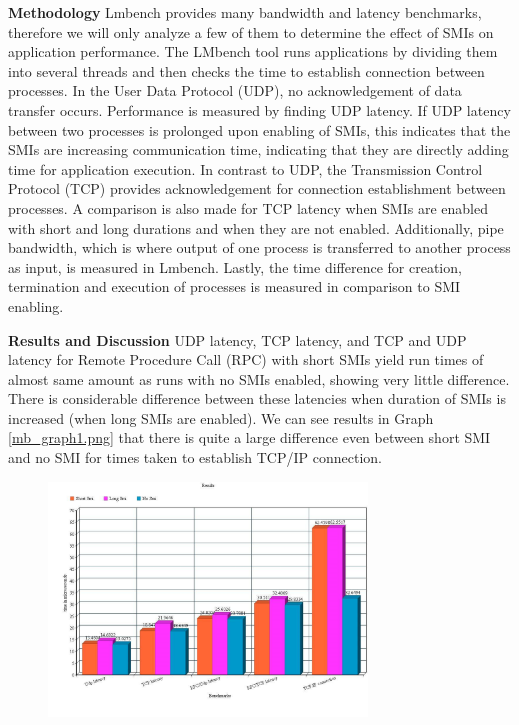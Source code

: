 \documentclass{IEEEtran}
\begin{document}
\textbf{Methodology}
Lmbench provides many bandwidth and latency benchmarks, therefore we will only analyze a few of them to determine the effect of SMIs on application performance. The LMbench tool runs applications by dividing them into several threads and then checks the time to establish connection between processes. In the User Data Protocol (UDP), no acknowledgement of data transfer occurs. Performance is measured by finding UDP latency. If UDP latency between two processes is prolonged upon enabling of SMIs, this indicates that the SMIs are increasing communication time, indicating that they are directly adding time for application execution. In contrast to UDP, the Transmission Control Protocol (TCP) provides acknowledgement for connection establishment between processes. A comparison is also made for TCP latency when SMIs are enabled with short and long durations and when they are not enabled. Additionally, pipe bandwidth, which is where output of one process is transferred to another process as input, is measured in Lmbench. Lastly, the time difference for creation, termination and execution of processes is measured in comparison to SMI enabling. 

\textbf{Results and Discussion}
UDP latency, TCP latency, and TCP and UDP latency for Remote Procedure Call (RPC) with short SMIs yield run times of almost same amount as runs with no SMIs enabled, showing very little difference. There is considerable difference between these latencies when duration of SMIs is increased (when long SMIs are enabled). We can see results in Graph \ref{mb_graph1.png} that there is quite a large difference even between short SMI and no SMI for times taken to establish TCP/IP connection.\\

\begin{figure}[H]
   \includegraphics[keepaspectratio=true,width=240pt]{mb_graph1.png}
   \caption{ }
\end{figure}
\end{document}
